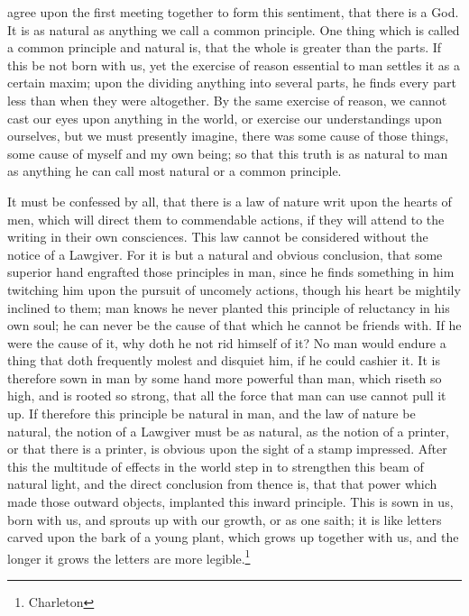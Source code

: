 \documentclass[a5paper]{book}
\begin{document}
    agree upon the first meeting together to form this sentiment, 
    that there is a God. 
It is as natural as anything we call a common principle. 
One thing which is called a common principle and natural is, 
    that the whole is greater than the parts. 
If this be not born with us, 
    yet the exercise of reason essential to man settles it as a certain maxim; 
    upon the dividing anything into several parts,
    he finds every part less than when they were altogether. 
By the same exercise of reason, 
    we cannot cast our eyes upon anything in the world, 
    or exercise our understandings upon ourselves, 
    but we must presently imagine, 
    there was some cause of those things, 
    some cause of myself and my own being; 
    so that this truth is as natural
    to man as anything he can call most natural or a common principle.

It must be confessed by all, 
    that there is a law of nature writ upon the hearts of men, 
    which will direct them to commendable actions,
    if they will attend to the writing in their own consciences. 
This law cannot be considered without the notice of a Lawgiver. 
For it is but a natural and obvious conclusion, 
    that some superior hand engrafted those principles in man, 
    since he finds something in him twitching him upon 
    the pursuit of uncomely actions, 
    though his heart be mightily inclined to them; 
    man knows he never planted this principle of reluctancy in his own soul; 
    he can never be the cause of that which he cannot be friends with. 
If he were the cause of it, why doth he not rid himself of it? 
No man would endure a thing that doth frequently molest and disquiet him, 
    if he could cashier it. 
It is therefore sown in man by some hand more powerful than man,
    which riseth so high, and is rooted so strong, 
    that all the force that man can use cannot pull it up. 
If therefore this principle be natural in man, 
    and the law of nature be natural, 
    the notion of a Lawgiver must be as natural, 
    as the notion of a printer, 
    or that there is a printer, 
    is obvious upon the sight of a stamp impressed. 
After this the multitude of effects in the world step in 
    to strengthen this beam of natural light, 
    and the direct conclusion from thence is, 
    that that power which made those outward objects, 
    implanted this inward principle. 
This is sown in us, born with us, 
    and sprouts up with our growth, or as one saith; 
    it is like letters carved upon the bark of a %
    young plant, 
    which grows up together with us, 
    and the longer it grows the letters are more legible.\footnote{Charleton}
\end{document}
